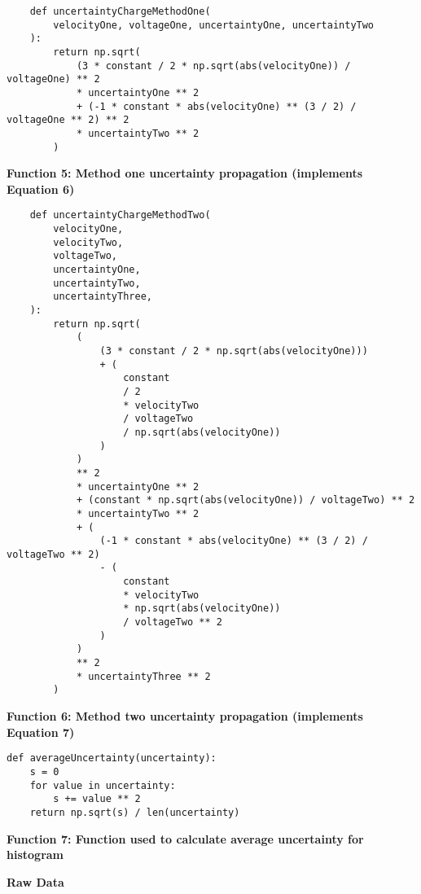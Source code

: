 \documentclass[
	letterpaper, %
	10pt, %
]{CSUniSchoolLabReport}
\begin{document}
\begin{verbatim}
    def uncertaintyChargeMethodOne(
        velocityOne, voltageOne, uncertaintyOne, uncertaintyTwo
    ):
        return np.sqrt(
            (3 * constant / 2 * np.sqrt(abs(velocityOne)) / voltageOne) ** 2
            * uncertaintyOne ** 2
            + (-1 * constant * abs(velocityOne) ** (3 / 2) / voltageOne ** 2) ** 2
            * uncertaintyTwo ** 2
        )
    \end{verbatim}
\begin{center}
    \textbf{Function 5: Method one uncertainty propagation (implements Equation 6)}
\end{center}
\newpage
\begin{verbatim}
    def uncertaintyChargeMethodTwo(
        velocityOne,
        velocityTwo,
        voltageTwo,
        uncertaintyOne,
        uncertaintyTwo,
        uncertaintyThree,
    ):
        return np.sqrt(
            (
                (3 * constant / 2 * np.sqrt(abs(velocityOne)))
                + (
                    constant
                    / 2
                    * velocityTwo
                    / voltageTwo
                    / np.sqrt(abs(velocityOne))
                )
            )
            ** 2
            * uncertaintyOne ** 2
            + (constant * np.sqrt(abs(velocityOne)) / voltageTwo) ** 2
            * uncertaintyTwo ** 2
            + (
                (-1 * constant * abs(velocityOne) ** (3 / 2) / voltageTwo ** 2)
                - (
                    constant
                    * velocityTwo
                    * np.sqrt(abs(velocityOne))
                    / voltageTwo ** 2
                )
            )
            ** 2
            * uncertaintyThree ** 2
        )
    \end{verbatim}
\begin{center}
    \textbf{Function 6: Method two uncertainty propagation (implements Equation 7)}
\end{center}

\begin{verbatim}
def averageUncertainty(uncertainty):
    s = 0
    for value in uncertainty:
        s += value ** 2
    return np.sqrt(s) / len(uncertainty)
\end{verbatim}
\begin{center}
    \textbf{Function 7: Function used to calculate average uncertainty for histogram}
\end{center}
{\Large\textbf{Raw Data}}
\end{document}
